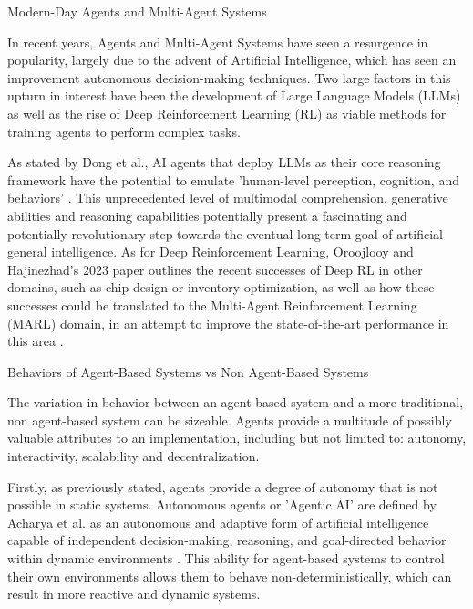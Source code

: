 \documentclass[a4paper,9pt]{scrartcl}
\makeatletter
\renewcommand{\subsection}{\@startsection{subsection}{2}{0mm}
  {0.25\baselineskip} 
  {0.25\baselineskip} 
  {\normalfont\normalsize\bfseries}}
\renewcommand{\section}{\@startsection{section}{1}{0mm}
  {1.5\baselineskip}
  {1\baselineskip} 
  {\normalfont\Large\bfseries}}
\makeatother
\begin{document}
\subsection{Modern-Day Agents and Multi-Agent Systems}

In recent years, Agents and Multi-Agent Systems have seen a resurgence in popularity,
largely due to the advent of Artificial Intelligence, which has seen an improvement
autonomous decision-making techniques. Two large factors in this upturn in interest have 
been the development of Large Language Models (LLMs) as well as the rise of Deep 
Reinforcement Learning (RL) as viable methods for training agents to perform complex tasks. 

As stated by Dong et al.\cite{dongSurveyLLMbasedAgents2024}, AI agents that deploy LLMs as 
their core reasoning framework have the potential to emulate 'human-level perception, cognition,
and behaviors' \cite{dongSurveyLLMbasedAgents2024}. This unprecedented level of multimodal
comprehension, generative abilities and reasoning capabilities potentially present a fascinating and potentially
revolutionary step towards the eventual long-term goal of artificial general intelligence. As 
for Deep Reinforcement Learning, Oroojlooy and Hajinezhad's 2023 paper outlines the recent successes 
of Deep RL in other domains, such as chip design or inventory optimization, as well as how these 
successes could be translated to the Multi-Agent Reinforcement Learning (MARL) domain,
in an attempt to improve the state-of-the-art performance in this area
\cite{oroojlooyReviewCooperativeMultiagent2023}.	


\section{Behaviors of Agent-Based Systems vs Non Agent-Based Systems}

The variation in behavior between an agent-based system and a more traditional,
non agent-based system can be sizeable. Agents provide a multitude of possibly valuable 
attributes to an implementation, including but not limited to: 
autonomy, interactivity, scalability and decentralization.

Firstly, as previously stated, agents provide a degree of autonomy that is not 
possible in static systems. Autonomous agents or 'Agentic AI' are defined by Acharya et al. as an 
autonomous and adaptive form of artificial intelligence capable of independent decision-making, 
reasoning, and goal-directed behavior within dynamic environments \cite{acharyaAgenticAIAutonomous2025}. 
This ability for agent-based systems to control their own environments allows them to behave 
non-deterministically, which can result in more reactive and dynamic systems. 
\end{document}
